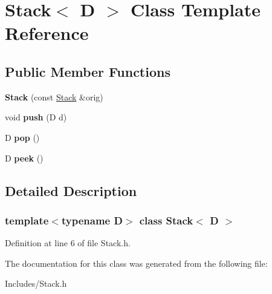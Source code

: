 \hypertarget{class_stack}{}\section{Stack$<$ D $>$ Class Template Reference}
\label{class_stack}
\subsection*{Public Member Functions}
\begin{DoxyCompactItemize}
\item 
\mbox{\label{class_stack_a55e5793404d42ba905f1a7ab90092807}} 
{\bfseries Stack} (const \hyperlink{class_stack}{Stack} \&orig)
\item 
\mbox{\label{class_stack_acf4211784a34b61ed4ba49272f23351f}} 
void {\bfseries push} (D d)
\item 
\mbox{\label{class_stack_a54e8fd6fd2a8b828b7b66f171499e956}} 
D {\bfseries pop} ()
\item 
\mbox{\label{class_stack_a5717795349538863baaeafe7e25df76a}} 
D {\bfseries peek} ()
\end{DoxyCompactItemize}


\subsection{Detailed Description}
\subsubsection*{template$<$typename D$>$\newline
class Stack$<$ D $>$}



Definition at line 6 of file Stack.\+h.



The documentation for this class was generated from the following file\+:\begin{DoxyCompactItemize}
\item 
Includes/Stack.\+h\end{DoxyCompactItemize}
